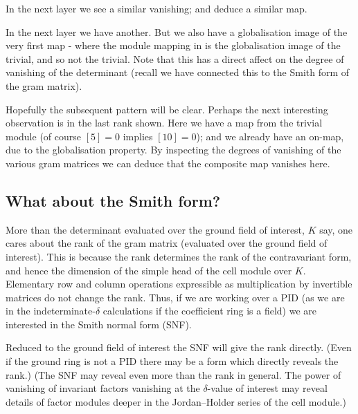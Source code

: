 \documentclass{article}
\theoremstyle{definition}
\numberwithin{equation}{subsection}
\begin{document}
In the next layer we see a similar vanishing; and deduce a similar map.

In the next layer we have another. But we also have a globalisation image of
the very first map - where the module mapping in is
the globalisation image of the trivial, and so 
not the trivial.
Note that this has a direct affect on the degree of vanishing of the determinant (recall we have connected this to the Smith form of the gram matrix). 

Hopefully the subsequent pattern will be clear.
Perhaps the next interesting observation is in the last rank shown.
Here we have a map from the trivial module (of course $[5]=0$ implies $[10]=0$);
and we already have an on-map, due to the globalisation property. 
By inspecting the degrees of vanishing of the various gram matrices we can
deduce that the composite map vanishes here.


\vspace{.5cm}
\subsection{What about the Smith form?} 
More than the determinant evaluated over the ground field of interest,
$K$ say,
one cares about the rank of the gram matrix
(evaluated over the ground field of interest).
This is because the rank
 determines the rank of the contravariant form, and hence
the dimension of the simple head of the cell module over $K$. 
Elementary row and column operations expressible as multiplication by 
invertible matrices do not change the rank. Thus, if we are working
over a PID (as we are in the indeterminate-$\delta$ calculations 
if the coefficient ring is a field)
we are interested in the Smith normal form (SNF).

Reduced to the ground field of interest the SNF will give the rank
directly.
(Even if the ground ring is not a PID there may be a form which
directly reveals the rank.)
(The SNF may reveal even more than the rank in general. 
The power of vanishing of
invariant factors vanishing   %
at the $\delta$-value 
of interest may reveal details of factor modules deeper in the
Jordan--Holder series of the cell module.) 
\end{document}
